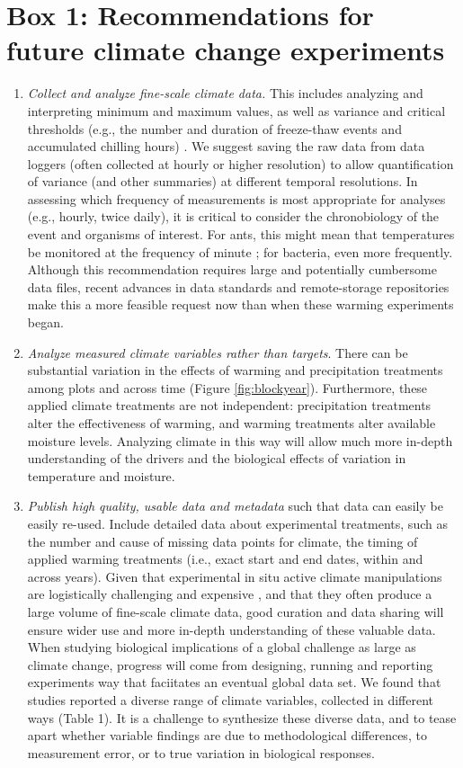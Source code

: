 \documentclass{article}
\begin{document}
\section* {Box 1: Recommendations for future climate change experiments} 
\begin{enumerate}
\item\textit{Collect and analyze fine-scale climate data.} This includes analyzing and interpreting minimum and maximum values, as well as variance and critical thresholds (e.g., the number and duration of freeze-thaw events and accumulated chilling hours) \citep{mcdaniel2014,vasseur2014}. We suggest saving the raw data from data loggers (often collected at hourly or higher resolution) to allow quantification of variance (and other summaries) at different temporal resolutions. In assessing which frequency of measurements is most appropriate for analyses (e.g., hourly, twice daily), it is critical to consider the chronobiology of the event and organisms of interest. For ants, this might mean that temperatures be monitored at the frequency of minute \citep{shavit2017}; for bacteria, even more frequently. Although this recommendation requires large and potentially cumbersome data files, recent advances in data standards and remote-storage repositories make this a more feasible request now than when these warming experiments began.
\item\textit{Analyze measured climate variables rather than targets}. There can be substantial variation in the effects of warming and precipitation treatments among plots and across time (Figure \ref{fig:blockyear}). Furthermore, these applied climate treatments are not independent: precipitation treatments alter the effectiveness of warming, and warming treatments alter available moisture levels. Analyzing climate in this way will allow much more in-depth understanding of the drivers and the biological effects of variation in temperature and moisture. 
\item\textit{Publish high quality, usable data and metadata} such that data can easily be easily re-used. Include detailed data about experimental treatments, such as the number and cause of missing data points for climate, the timing of applied warming treatments (i.e., exact start and end dates, within and across years). Given that experimental in situ active climate manipulations are logistically challenging and expensive \citep{aronson2009}, and that they often produce a large volume of fine-scale climate data, good curation and data sharing will ensure wider use and more in-depth understanding of these valuable data. When studying biological implications of a global challenge as large as climate change, progress will come from designing, running and reporting experiments way that faciitates an eventual global data set. We found that studies reported a diverse range of climate variables, collected in different ways (Table 1). It is a challenge to synthesize these diverse data, and to tease apart whether variable findings are due to methodological differences, to measurement error, or to true variation in biological responses. %

\end{enumerate}
\end{document}
